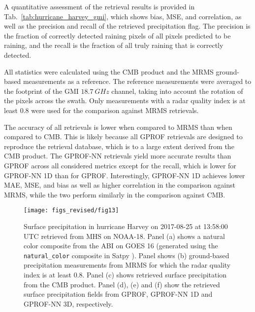 \documentclass[journal abbreviation, manuscript]{copernicus}
\begin{document}
A quantitative assessment of the retrieval results is provided in
Tab.~\ref{tab:hurricane_harvey_gmi}, which shows bias, MSE, and correlation, as
well as the precision and recall of the retrieved precipitation flag. The
precision is the fraction of correctly detected raining pixels of all pixels
predicted to be raining, and the recall is the fraction of all truly raining
that is correctly detected.

All statistics were calculated using the CMB product and the MRMS ground-based
measurements as a reference. The reference measurements were averaged to the
footprint of the GMI $18.7\ \unit{GHz}$ channel, taking into account the
rotation of the pixels across the swath. Only measurements with a radar quality
index is at least 0.8 were used for the comparison against MRMS retrievals.

The accuracy of all retrievals is lower when compared to MRMS than when compared
to CMB. This is likely because all GPROF retrievals are designed to reproduce
the retrieval database, which is to a large extent derived from the CMB product.
The GPROF-NN retrievals yield more accurate results than GPROF across all
considered metrics except for the recall, which is lower for GPROF-NN 1D than
for GPROF. Interestingly, GPROF-NN 1D achieves lower MAE, MSE, and bias as well
as higher correlation in the comparison against MRMS, while the two perform
similarly in the comparison against CMB.


\begin{figure}[hbpt]
  \centering
  \texttt{[image: figs\_revised/fig13]}
    \caption{Surface precipitation in hurricane Harvey on 2017-08-25 at 13:58:00
      UTC retrieved from MHS on NOAA-18. Panel (a) shows a natural color composite
      from the ABI on GOES 16 (generated using the \texttt{natural\_color} composite in Satpy
      \citep{satpy}). Panel shows (b) ground-based precipitation measurements
      from MRMS for which the radar quality index is at least 0.8. Panel (c) shows
      retrieved surface precipitation from the CMB product. Panel (d), (e) and
      (f) show the retrieved surface precipitation fields from GPROF, GPROF-NN
      1D and GPROF-NN 3D, respectively.}
  \label{fig:harvey_mhs}
\end{figure}
\end{document}
